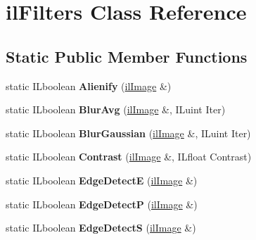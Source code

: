 \hypertarget{classilFilters}{
\section{ilFilters Class Reference}
\label{classilFilters}
}
\subsection*{Static Public Member Functions}
\begin{DoxyCompactItemize}
\item 
\hypertarget{classilFilters_ad885b4677507b4bf53ddb24d500b2901}{
static ILboolean {\bfseries Alienify} (\hyperlink{classilImage}{ilImage} \&)}
\label{classilFilters_ad885b4677507b4bf53ddb24d500b2901}

\item 
\hypertarget{classilFilters_a00d7a6ad191c8ea5418e038b19aed632}{
static ILboolean {\bfseries BlurAvg} (\hyperlink{classilImage}{ilImage} \&, ILuint Iter)}
\label{classilFilters_a00d7a6ad191c8ea5418e038b19aed632}

\item 
\hypertarget{classilFilters_ae1d81ab10cf08d7a0fa4db932a93bb08}{
static ILboolean {\bfseries BlurGaussian} (\hyperlink{classilImage}{ilImage} \&, ILuint Iter)}
\label{classilFilters_ae1d81ab10cf08d7a0fa4db932a93bb08}

\item 
\hypertarget{classilFilters_a4f49e9ded30829e5e70f7e39588ee308}{
static ILboolean {\bfseries Contrast} (\hyperlink{classilImage}{ilImage} \&, ILfloat Contrast)}
\label{classilFilters_a4f49e9ded30829e5e70f7e39588ee308}

\item 
\hypertarget{classilFilters_a8322055521f70b182c1ab7bc8dc907df}{
static ILboolean {\bfseries EdgeDetectE} (\hyperlink{classilImage}{ilImage} \&)}
\label{classilFilters_a8322055521f70b182c1ab7bc8dc907df}

\item 
\hypertarget{classilFilters_aef519861ad2fac4bf3bde431d1b26e17}{
static ILboolean {\bfseries EdgeDetectP} (\hyperlink{classilImage}{ilImage} \&)}
\label{classilFilters_aef519861ad2fac4bf3bde431d1b26e17}

\item 
\hypertarget{classilFilters_ac8e0f068f4bb99cadc85cc38f1474e09}{
static ILboolean {\bfseries EdgeDetectS} (\hyperlink{classilImage}{ilImage} \&)}
\label{classilFilters_ac8e0f068f4bb99cadc85cc38f1474e09}


\end{DoxyCompactItemize}
